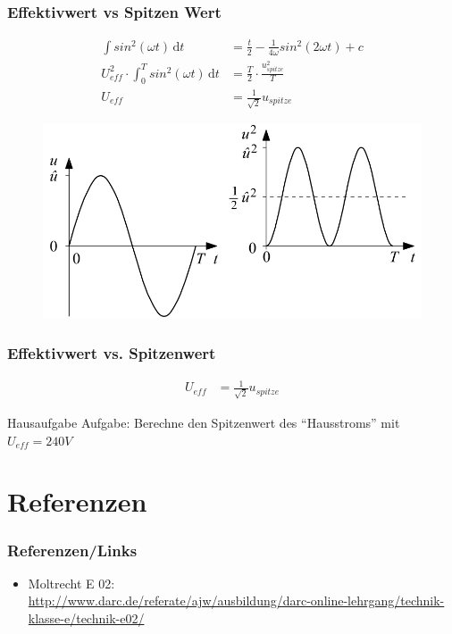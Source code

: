 \begin{frame}
  \frametitle{Effektivwert vs Spitzen Wert}
  \begin{align}
    \int \! sin^2(\omega t) \, \mathrm{d}t & = \frac{t}{2} - \frac{1}{4\omega}sin^2(2\omega t) + c \\
    U_{eff}^2 \cdot \int_0^T \! sin^2(\omega t) \, \mathrm{d}t & = \frac{T}{2} \cdot \frac{u_{spitze}^2}{T} \\
    U_{eff} & = \frac{1}{\sqrt{2}} u_{spitze}
  \end{align}
  \begin{center}
    \begin{figure}
      \includegraphics[width=.6\textwidth,height=.3\textheight,keepaspectratio]{e02/EffektivwertSinus.png}\\
    \end{figure}
  \end{center}
\end{frame}

\begin{frame}
    \frametitle{Effektivwert vs. Spitzenwert}
    \begin{align} 
		U_{eff} & = \frac{1}{\sqrt{2}} u_{spitze}
	\end{align}
	\begin{alertblock}{Hausaufgabe}
	    Aufgabe: Berechne den Spitzenwert des ``Hausstroms'' mit $U_{eff} = 240V$
	\end{alertblock}
\end{frame}

\section*{Referenzen}

\begin{frame}
    \frametitle{Referenzen/Links}
    
    \footnotesize
    \begin{itemize}
        \item Moltrecht E 02: \\
              \url{http://www.darc.de/referate/ajw/ausbildung/darc-online-lehrgang/technik-klasse-e/technik-e02/}
    \end{itemize}

\end{frame}


